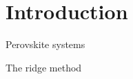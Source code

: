 \section{Introduction}
\label{sec:perovskites-introduction}

Perovskite systems

The ridge method 






\placeholder

